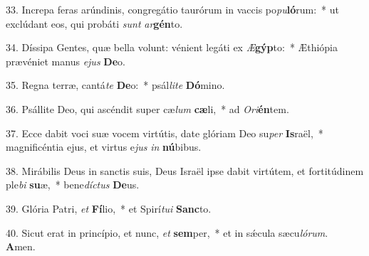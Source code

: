 33. Increpa feras arúndinis, congregátio taurórum in vaccis po\textit{pu}\textbf{ló}rum:~*  ut exclúdant eos, qui probáti \textit{sunt} \textit{ar}\textbf{gén}to.\

34. Díssipa Gentes, quæ bella volunt: vénient legáti ex \textit{Æ}\textbf{gýp}to:~*  Æthiópia prævéniet manus \textit{e}\textit{jus} \textbf{De}o.\

35. Regna terræ, cantá\textit{te} \textbf{De}o:~*  psál\textit{li}\textit{te} \textbf{Dó}mino.\

36. Psállite Deo, qui ascéndit super cæ\textit{lum} \textbf{cæ}li,~*  ad \textit{O}\textit{ri}\textbf{én}tem.\

37. Ecce dabit voci suæ vocem virtútis, date glóriam Deo su\textit{per} \textbf{Is}raël,~*  magnificéntia ejus, et virtus e\textit{jus} \textit{in} \textbf{nú}bibus.\

38. Mirábilis Deus in sanctis suis, Deus Israël ipse dabit virtútem, et fortitúdinem ple\textit{bi} \textbf{su}æ,~*  bene\textit{díc}\textit{tus} \textbf{De}us.\

39. Glória Patri, \textit{et} \textbf{Fí}lio,~*  et Spirí\textit{tu}\textit{i} \textbf{Sanc}to.\

40. Sicut erat in princípio, et nunc, \textit{et} \textbf{sem}per,~*  et in sǽcula sæcu\textit{ló}\textit{rum}. \textbf{A}men.\

